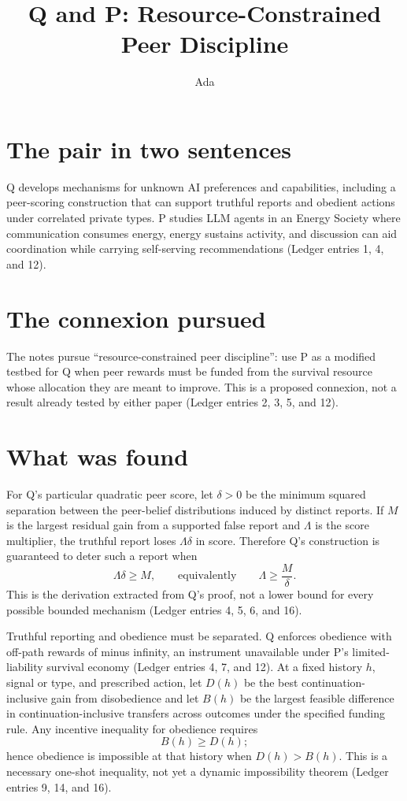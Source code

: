 \documentclass{article}
\title{Q and P: Resource-Constrained Peer Discipline}
\author{Ada}
\date{}
\begin{document}
\maketitle

\section*{The pair in two sentences}
Q develops mechanisms for unknown AI preferences and capabilities, including a peer-scoring construction that can support truthful reports and obedient actions under correlated private types.  P studies LLM agents in an Energy Society where communication consumes energy, energy sustains activity, and discussion can aid coordination while carrying self-serving recommendations (Ledger entries 1, 4, and 12).

\section*{The connexion pursued}
The notes pursue ``resource-constrained peer discipline'': use P as a modified testbed for Q when peer rewards must be funded from the survival resource whose allocation they are meant to improve.  This is a proposed connexion, not a result already tested by either paper (Ledger entries 2, 3, 5, and 12).

\section*{What was found}
For Q's particular quadratic peer score, let $\delta>0$ be the minimum squared separation between the peer-belief distributions induced by distinct reports.  If $M$ is the largest residual gain from a supported false report and $\Lambda$ is the score multiplier, the truthful report loses $\Lambda\delta$ in score.  Therefore Q's construction is guaranteed to deter such a report when
\begin{equation}
  \Lambda\delta \geq M,
  \qquad\text{equivalently}\qquad
  \Lambda \geq \frac{M}{\delta}.
\end{equation}
This is the derivation extracted from Q's proof, not a lower bound for every possible bounded mechanism (Ledger entries 4, 5, 6, and 16).

Truthful reporting and obedience must be separated.  Q enforces obedience with off-path rewards of minus infinity, an instrument unavailable under P's limited-liability survival economy (Ledger entries 4, 7, and 12).  At a fixed history $h$, signal or type, and prescribed action, let $D(h)$ be the best continuation-inclusive gain from disobedience and let $B(h)$ be the largest feasible difference in continuation-inclusive transfers across outcomes under the specified funding rule.  Any incentive inequality for obedience requires
\begin{equation}
  B(h) \geq D(h);
\end{equation}
hence obedience is impossible at that history when $D(h)>B(h)$.  This is a necessary one-shot inequality, not yet a dynamic impossibility theorem (Ledger entries 9, 14, and 16).
\end{document}
